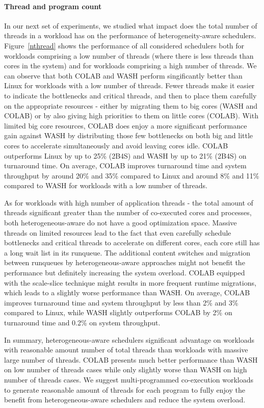 \paragraph{Thread and program count} In our next set of experiments, we studied what impact does the total number of threads in a workload has on the performance of heterogeneity-aware schedulers. Figure~\ref{nthread} shows the performance of all considered schedulers both for workloads comprising a low number of threads (where there is less threads than cores in the system) and for workloads comprising a high number of threads. We can observe that both COLAB and WASH perform singificantly better than Linux for workloads with a low number of threads. Fewer threads make it easier to indicate the bottlenecks and critical threads, and then to place them carefully on the appropriate resources - either by migrating them to big cores (WASH and COLAB) or by also giving high priorities to them on little cores (COLAB). With limited big core resources, COLAB does enjoy a more significant performance gain against WASH by distributing those few bottlenecks on both big and little cores to accelerate simultaneously and avoid leaving cores idle. COLAB outperforms Linux by up to 25\% (2B4S) and WASH by up to 21\% (2B4S) on turnaround time. On average, COLAB improves turnaround time and system throughput by around 20\% and 35\% compared to Linux and around 8\% and 11\% compared to WASH for workloads with a low number of threads.

As for workloads with high number of application threads - the total amount of threads significant greater than the number of co-executed cores and processes, both heterogeneous-aware do not have a good optimization space. Massive threads on limited resources lead to the fact that even carefully schedule bottlenecks and critical threads to accelerate on different cores, each core still has a long wait list in its runqueue. The additional content switches and migration between runqueues by heterogeneous-aware approaches might not benefit the performance but definitely increasing the system overload. COLAB equipped with the scale-slice technique might results in more frequent runtime migrations, which leads to a slightly worse performance than WASH. On average, COLAB improves turnaround time and system throughput by less than 2\% and 3\% compared to Linux, while WASH slightly outperforms COLAB by 2\% on turnaround time and 0.2\% on system throughput.

In summary, heterogeneous-aware schedulers significant advantage on workloads with reasonable amount number of total threads than workloads with massive large number of threads. COLAB presents much better performance than WASH on low number of threads cases while only slightly worse than WASH on high number of threads cases. We suggest multi-programmed co-execution workloads to generate reasonable amount of threads for each program to fully enjoy the benefit from heterogeneous-aware schedulers and reduce the system overload.


